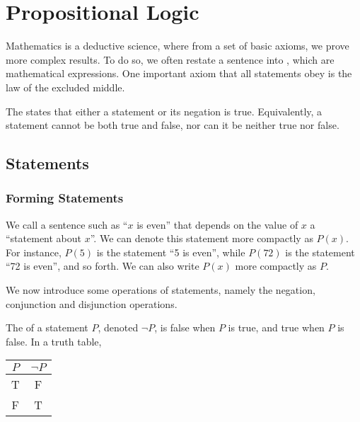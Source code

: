 \chapter{Propositional Logic}

Mathematics is a deductive science, where from a set of basic axioms, we prove more complex results. To do so, we often restate a sentence into , which are mathematical expressions. One important axiom that all statements obey is the law of the excluded middle.

\begin{axiom}
    The  states that either a statement or its negation is true. Equivalently, a statement cannot be both true and false, nor can it be neither true nor false.
\end{axiom}

\section{Statements}

\subsection{Forming Statements}

We call a sentence such as ``$x$ is even'' that depends on the value of $x$ a ``statement about $x$''. We can denote this statement more compactly as $P(x)$. For instance, $P(5)$ is the statement ``5 is even'', while $P(72)$ is the statement ``72 is even'', and so forth. We can also write $P(x)$ more compactly as $P$.

We now introduce some operations of statements, namely the negation, conjunction and disjunction operations.

\begin{definition}
    The  of a statement $P$, denoted $\lnot P$, is false when $P$ is true, and true when $P$ is false. In a truth table,
    \begin{table}[H]
        \centering
        \begin{tabular}{|c|c|}
        \hline
        $P$ & $\lnot P$ \\ \hline\hline
        T & F \\ \hline
        F & T \\ \hline
        \end{tabular}
    \end{table}
\end{definition}

